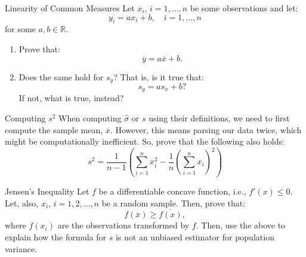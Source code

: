 \documentclass[aspectratio=169, 12pt, xcolor=table]{beamer}
\begin{document}
	\begin{frame}{Linearity of Common Measures}
		Let $x_i$, $i=1,\ldots,n$ be some observations and let:
		\[y_i=ax_i+b,\quad i=1,\ldots,n\]
		for some $a,b\in\mathbb{R}$.
		\begin{enumerate}
			\item Prove that:
			\[\overline{y}=a\overline{x}+b.\]
			\item Does the same hold for $s_y$? That is, is it true that:
			\[s_y=as_x+b?\]
			If not, what is true, instead?
		\end{enumerate}
	\end{frame}

	\begin{frame}{Computing $s^2$}
		When computing $\hat{\sigma}$ or $s$ using their definitions, we need to first compute the sample mean, $\overline{x}$. However, this means parsing our data twice, which might be computationally inefficient. So, prove that the following also holds:
		\[s^2=\frac{1}{n-1}\left(\sum_{i=1}^nx_i^2-\frac{1}{n}\left(\sum_{i=1}^nx_i\right)^2\right)\]
	\end{frame}

	\begin{frame}{Jensen's Inequality}
		Let $f$ be a differentiable concave function, i.e., $f'(x)\leq0$. Let, also, $x_i$, $i=1,2,\ldots,n$ be a random sample. Then, prove that:
		\[f(\overline{x})\geq\overline{f(x)},\]
		where $f(x_i)$ are the observations transformed by $f$. Then, use the above to explain how the formula for $s$ is not an unbiased estimator for population variance.
	\end{frame}

	
\end{document}
